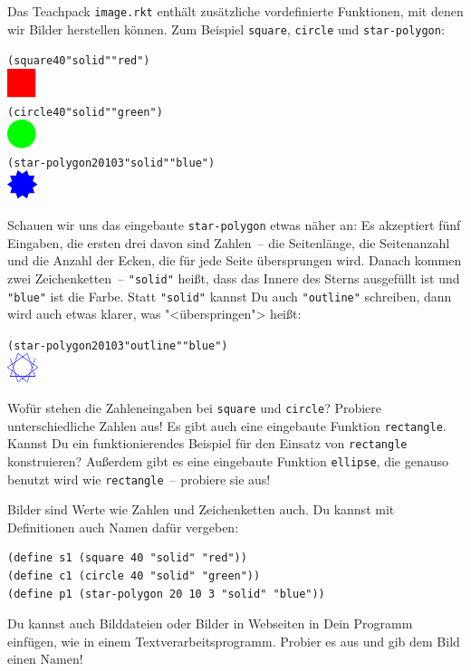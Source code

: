 Das Teachpack \texttt{image.rkt} enthält zusätzliche vordefinierte
Funktionen, mit denen wir Bilder herstellen können.  Zum Beispiel
\texttt{square}, \texttt{circle} und \texttt{star-polygon}:
%
\begin{alltt}
(square 40 "solid" "red")
\evalsto{} \includegraphics[height=24pt]{i1prog/square}
(circle 40 "solid" "green")
\evalsto{} \includegraphics[height=24pt]{i1prog/circle}
(star-polygon 20 10 3 "solid" "blue")
\evalsto{} \includegraphics[height=24pt]{i1prog/starpolygon}
\end{alltt}
%
Schauen wir uns das eingebaute \texttt{star-polygon} etwas näher an:
Es akzeptiert fünf Eingaben, die ersten drei davon sind Zahlen~-- die
Seitenlänge, die Seitenanzahl und die Anzahl der Ecken, die für jede
Seite übersprungen wird.  Danach kommen zwei Zeichenketten~--
\verb|"solid"| heißt, dass das Innere des Sterns ausgefüllt ist und
\verb|"blue"| ist die Farbe.  Statt \verb|"solid"| kannst Du auch
\verb|"outline"| schreiben, dann wird auch etwas klarer, was
"<überspringen"> heißt:
%
\begin{alltt}
(star-polygon 20 10 3 "outline" "blue")
\evalsto{} \includegraphics[height=24pt]{i1prog/starpolygon_outline}
\end{alltt}
%
\begin{aufgabe}
  Wofür stehen die Zahleneingaben bei \texttt{square} und
  \texttt{circle}?  Probiere unterschiedliche Zahlen aus!  Es gibt
  auch eine eingebaute Funktion \texttt{rectangle}.  Kannst Du ein
  funktionierendes Beispiel für den Einsatz von \texttt{rectangle}
  konstruieren?  Außerdem gibt es eine eingebaute Funktion
  \texttt{ellipse}, die genauso benutzt wird wie \texttt{rectangle}~--
  probiere sie aus!
\end{aufgabe}
%
Bilder sind Werte wie Zahlen und Zeichenketten auch.  Du kannst
mit Definitionen auch Namen dafür vergeben:
%
\begin{verbatim}
(define s1 (square 40 "solid" "red"))
(define c1 (circle 40 "solid" "green"))
(define p1 (star-polygon 20 10 3 "solid" "blue"))
\end{verbatim}
%
\begin{aufgabe}
  Du kannst auch Bilddateien oder Bilder in Webseiten in Dein Programm
  einfügen, wie in einem Textverarbeitsprogramm.  Probier es aus und
  gib dem Bild einen Namen!
\end{aufgabe}

